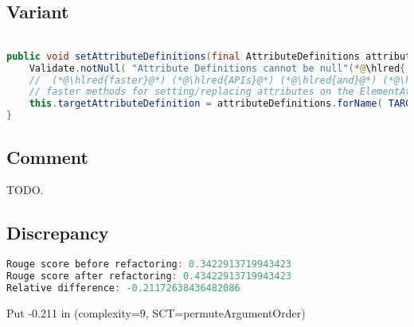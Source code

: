 \documentclass[11pt]{article}
\DeclareRobustCommand{\hlred}[1]{{\sethlcolor{YellowOrange}\hl{#1}}}
\begin{document}
  \subsection{Variant}

  \begin{lstlisting}[language=java]

public void setAttributeDefinitions(final AttributeDefinitions attributeDefinitions) {
    Validate.notNull( "Attribute Definitions cannot be null"(*@\hlred{,attributeDefinitions}@*));
    //  (*@\hlred{faster}@*) (*@\hlred{APIs}@*) (*@\hlred{and}@*) (*@\hlred{methods}@*) (*@\hlred{and}@*) (*@\hlred{thus}@*) (*@\hlred{use}@*) (*@\hlred{only}@*) (*@\hlred{for}@*) (*@\hlred{building}@*) (*@\hlred{elements}@*) (*@\hlred{but}@*) (*@\hlred{rather}@*) (*@\hlred{for}@*) (*@\hlred{using}@*) (*@\hlred{with}@*)
    // faster methods for setting/replacing attributes on the ElementAttributes implementation
    this.targetAttributeDefinition = attributeDefinitions.forName( TARGET_ATTR_NAME(*@\hlred{TEMPLATE\_MODE}@*) );
}
  \end{lstlisting}

  \subsection{Comment}

  TODO.

  \subsection{Discrepancy}

  \begin{lstlisting}[language=java]
Rouge score before refactoring: 0.3422913719943423
Rouge score after refactoring: 0.43422913719943423
Relative difference: -0.21172638436482086
  \end{lstlisting}

  Put -0.211 in (complexity=9, SCT=permuteArgumentOrder)
\end{document}
